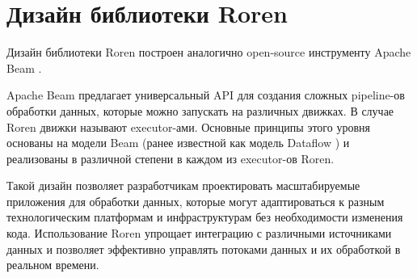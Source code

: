 \section{Дизайн библиотеки Roren}
\label{sec:design}

Дизайн библиотеки Roren построен аналогично open-source инструменту Apache Beam \cite{beam}.

Apache Beam предлагает универсальный API для создания сложных pipeline-ов обработки данных, которые можно запускать на различных движках. В случае Roren движки называют executor-ами. Основные принципы этого уровня основаны на модели Beam (ранее известной как модель Dataflow \cite{dataflow}) и реализованы в различной степени в каждом из executor-ов Roren.

Такой дизайн позволяет разработчикам проектировать масштабируемые приложения для обработки данных, которые могут адаптироваться к разным технологическим платформам и инфраструктурам без необходимости изменения кода. Использование Roren упрощает интеграцию с различными источниками данных и позволяет эффективно управлять потоками данных и их обработкой в реальном времени.

\newpage

\newpage

\newpage

